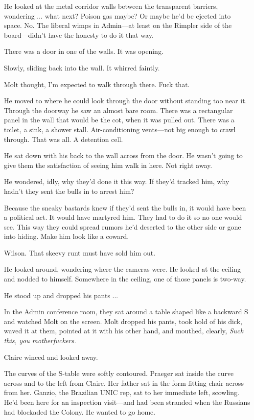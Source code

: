 He looked at the metal corridor walls between the transparent barriers, wondering ... what next? Poison gas maybe? Or maybe he'd be ejected into space. No. The liberal wimps in Admin---at least on the Rimpler side of the board---didn't have the honesty to do it that way.

There was a door in one of the walls. It was opening.

Slowly, sliding back into the wall. It whirred faintly.

Molt thought, I'm expected to walk through there. Fuck that.

He moved to where he could look through the door without standing too near it. Through the doorway he saw an almost bare room. There was a rectangular panel in the wall that would be the cot, when it was pulled out. There was a toilet, a sink, a shower stall. Air-conditioning vents---not big enough to crawl through. That was all. A detention cell.

He sat down with his back to the wall across from the door. He wasn't going to give them the satisfaction of seeing him walk in here. Not right away.

He wondered, idly, why they'd done it this way. If they'd tracked him, why hadn't they sent the bulls in to arrest him?

Because the sneaky bastards knew if they'd sent the bulls in, it would have been a political act. It would have martyred him. They had to do it so no one would see. This way they could spread rumors he'd deserted to the other side or gone into hiding. Make him look like a coward.

Wilson. That skeevy runt must have sold him out.

He looked around, wondering where the cameras were. He looked at the ceiling and nodded to himself. Somewhere in the ceiling, one of those panels is two-way.

He stood up and dropped his pants ...

In the Admin conference room, they sat around a table shaped like a backward S and watched Molt on the screen. Molt dropped his pants, took hold of his dick, waved it at them, pointed at it with his other hand, and mouthed, clearly, \textit{Suck this, you motherfuckers.}

Claire winced and looked away.

The curves of the S-table were softly contoured. Praeger sat inside the curve across and to the left from Claire. Her father sat in the form-fitting chair across from her. Ganzio, the Brazilian UNIC rep, sat to her immediate left, scowling. He'd been here for an inspection visit---and had been stranded when the Russians had blockaded the Colony. He wanted to go home.

